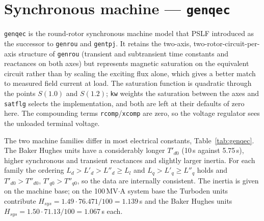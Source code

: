 \section{Synchronous machine --- \texttt{genqec}}
\label{sec:genqec}

\texttt{genqec} is the round-rotor synchronous machine model that PSLF introduced
as the successor to \texttt{genrou} and \texttt{gentpj}. It retains the two-axis,
two-rotor-circuit-per-axis structure of \texttt{genrou} (transient and subtransient
time constants and reactances on both axes) but represents magnetic saturation on the
equivalent circuit rather than by scaling the exciting flux alone, which gives a
better match to measured field current at load. The saturation function is quadratic
through the points $S(1.0)$ and $S(1.2)$; \texttt{kw} weights the saturation between
the axes and \texttt{satflg} selects the implementation, and both are left at their
defaults of zero here. The compounding terms \texttt{rcomp}/\texttt{xcomp} are zero,
so the voltage regulator sees the unloaded terminal voltage.

The two machine families differ in most electrical constants, Table~\ref{tab:genqec}.
The Baker Hughes units have a considerably longer $T'_{d0}$ (10\,s against 5.75\,s),
higher synchronous and transient reactances and slightly larger inertia. For each
family the ordering $L_d > L'_d > L''_d \geq L_l$ and $L_q > L'_q \geq L''_q$ holds and
$T'_{d0} > T''_{d0}$, $T'_{q0} > T''_{q0}$, so the data are internally consistent.
The inertia is given on the machine base; on the 100\,MV$\cdot$A system base the
Turboden units contribute $H_{sys} = 1.49 \cdot 76.471 / 100 = 1.139$\,s and the Baker
Hughes units $H_{sys} = 1.50 \cdot 71.13 / 100 = 1.067$\,s each.

\begin{table}[!ht]
\centering

\caption{\texttt{genqec} parameters (pu on machine base unless noted).}
\label{tab:genqec}
\end{table}
